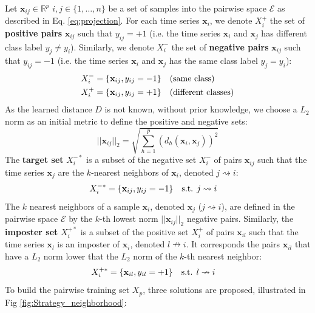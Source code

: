 Let $\textbf{x}_{ij} \in \mathbb{R}^p$ $i,j \in \{1,\ldots,n\}$ be a set of samples into the pairwise space $\mathcal{E}$ as described in Eq. \ref{eq:projection}. For each time series $\textbf{x}_{i}$, we denote $X_i^+$ the set of \textbf{positive pairs} $\textbf{x}_{ij}$ such that $y_{ij}=+1$ (i.e. the time series $\textbf{x}_i$ and $\textbf{x}_j$ has different class label $y_j \neq y_i$). Similarly, we denote $X_i^-$ the set of \textbf{negative pairs} $\textbf{x}_{ij}$ such that $y_{ij}=-1$ (i.e. the time series $\textbf{x}_i$ and $\textbf{x}_j$ has the same class label $y_j = y_i$):
\begin{align}
	X_i^- = \{\textbf{x}_{ij},y_{ij}=-1\} &\text{\quad (same class)} \\
	X_i^+ = \{\textbf{x}_{ij},y_{ij}=+1\} &\text{\quad (different classes)}
\end{align}
As the learned distance $D$ is not known, without prior knowledge, we choose a $L_2$ norm as an initial metric to define the positive and negative sets:\\
\begin{equation}
||\textbf{x}_{ij}||_2 = \sqrt{\sum\limits_{h=1}^{p}\left( d_h(\textbf{x}_{i}, \textbf{x}_{j})\right)^2}
\end{equation}
The \textbf{target set} $X_i^{-*}$ is a subset of the negative set $X_i^-$ of pairs $\textbf{x}_{ij}$ such that the time series $\textbf{x}_{j}$ are the $k$-nearest neighbors of $\textbf{x}_{i}$, denoted $j \rightsquigarrow i$:
\begin{align}
X_i^{-*} = \{\textbf{x}_{ij},y_{ij}=-1\} &\text{\quad s.t.   } j \rightsquigarrow i
\end{align}
The $k$ nearest neighbors of a sample $\textbf{x}_i$, denoted $\textbf{x}_j$ ($j \rightsquigarrow i$),  are defined in the pairwise space $\mathcal{E}$ by the $k$-th lowest norm $||\textbf{x}_{ij}||_2$ negative pairs. Similarly, the \textbf{imposter set} $X_i^{+*}$ is a subset of the positive set $X_i^+$ of pairs $\textbf{x}_{il}$ such that the time series $\textbf{x}_{l}$ is an imposter of $\textbf{x}_{i}$, denoted $l \nrightarrow i$. It corresponds the pairs $\textbf{x}_{il}$ that have a $L_2$ norm lower that the $L_2$ norm of the $k$-th nearest neighbor:
\begin{align}
X_i^{+*} = \{\textbf{x}_{il},y_{il}=+1\} &\text{\quad s.t.   } l \nrightarrow i
\end{align}
\noindent To build the pairwise training set $X_p$, three solutions are proposed, illustrated in Fig \ref{fig:Strategy_neighborhood}: 
